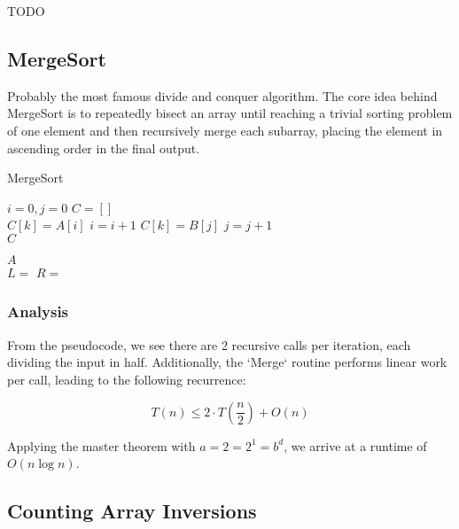 \documentclass{standalone}
\begin{document}
TODO

\subsection{MergeSort}

Probably the most famous divide and conquer algorithm. The core idea behind MergeSort is to repeatedly bisect an array until reaching a trivial sorting problem of one element and then recursively merge each subarray, placing the element in ascending order in the final output.

\begin{algorithm}
  \caption{MergeSort}
  \begin{algorithmic}
      \State $i = 0, j = 0$
      \State $C = []$ \\
          \State $C[k] = A[i]$
          \State $i = i + 1$
        \Else
        \State $C[k] = B[j]$
        \State $j = j + 1$ \\
      \EndIf
      \EndFor
      \Return $C$ \\
    \EndProcedure

        \Return $A$ \\
      \EndIf
      \State $L =$ 
      \State $R =$  \\
      \Return {}
    \EndProcedure
  \end{algorithmic}
\end{algorithm}

\subsubsection{Analysis}

From the pseudocode, we see there are 2 recursive calls per iteration, each dividing the input in half. Additionally, the `Merge` routine performs linear work per call, leading to the following recurrence:

\[
  T(n) \leqslant 2 \cdot T(\frac n 2) + O(n)
\]

Applying the master theorem with $a = 2 = 2^1 = b^d$, we arrive at a runtime of $O(n\log n)$.

\subsection{Counting Array Inversions}
\end{document}
